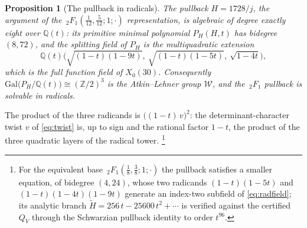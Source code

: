 \documentclass[cntp]{ipart}
\theoremstyle{plain}
\newtheorem{prop}[thm]{Proposition}
\theoremstyle{remark}
\begin{document}
\begin{prop}[The pullback in radicals]\label{prop:pullback}
The pullback $H=1728/j$, the argument of the
$\,_2F_1\!\left(\tfrac{1}{12},\tfrac{5}{12};1;\cdot\right)$ representation, is algebraic of degree exactly
eight over $\mathbb{Q}(t)$: its primitive minimal polynomial $P_H(H,t)$ has bidegree $(8,72)$, and the
splitting field of $P_H$ is the multiquadratic extension
\begin{equation}
\mathbb{Q}(t)\Big(\sqrt{(1-t)(1-9t)},\ \sqrt{(1-t)(1-5t)},\ \sqrt{1-4t}\Big),
\label{eq:radfield}
\end{equation}
which is the full function field of $X_0(30)$. Consequently
$\mathrm{Gal}\big(P_H/\mathbb{Q}(t)\big)\cong(\mathbb{Z}/2)^3$ is the Atkin--Lehner group $\mathcal{W}$, and
the $\,_2F_1$ pullback is solvable in radicals.
\end{prop}

The product of the three radicands is $\big((1-t)\,v\big)^2$:
the determinant-character twist $v$ of \eqref{eq:twist} is, up to sign and the rational factor $1-t$, the
product of the three quadratic layers of the radical tower.%
\footnote{For the equivalent base $\,_2F_1\!\left(\tfrac18,\tfrac38;1;\cdot\right)$ the pullback satisfies a
smaller equation, of bidegree $(4,24)$, whose two radicands $(1-t)(1-5t)$ and $(1-t)(1-4t)(1-9t)$ generate an
index-two subfield of \eqref{eq:radfield}; its analytic branch
$\widetilde H=256\,t-25600\,t^2+\cdots$ is verified against the certified $Q_V$ through the Schwarzian pullback identity to
order $t^{96}$.}
\end{document}
